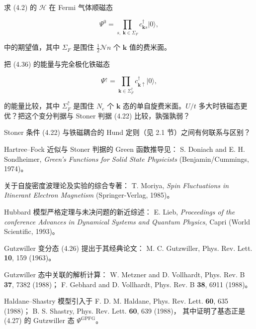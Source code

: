 \begin{exercises}

\item 求 (4.2) 的 $\mathcal{H}$ 在 Fermi 气体顺磁态

\begin{equation*}
\Psi^ {0} = \prod_ {s,\; \mathbf {k} \in \Sigma_ {F}} c _ {\mathbf {k} s} ^ {\dagger} | 0 \rangle ,
\tag{4.36}
\end{equation*}

中的期望值，其中 $\Sigma_{F}$ 是围住 $\frac{1}{2}\mathcal{N}n$ 个 $\mathbf{k}$ 值的费米面。

\item 把 (4.36) 的能量与完全极化铁磁态

\begin{equation*}
\Psi^ {\uparrow} = \prod_ {\mathbf {k} \in \Sigma_ {F} ^ {\uparrow}} c _ {\mathbf {k} \uparrow} ^ {\dagger} | 0 \rangle ,
\tag{4.37}
\end{equation*}

的能量比较，其中 $\Sigma_F^\uparrow$ 是围住 $N_e$ 个 $\mathbf{k}$ 态的单自旋费米面。$U/t$ 多大时铁磁态更优？把这个变分判据与 Stoner 判据 (4.22) 比较，孰强孰弱？

\item Stoner 条件 (4.22) 与铁磁耦合的 Hund 定则（见 2.1 节）之间有何联系与区别？

\end{exercises}

\begin{chapbib}
\item Hartree--Fock 近似与 Stoner 判据的 Green 函数推导见：
  S. Doniach and E. H. Sondheimer, \textit{Green's Functions for Solid State Physicists} (Benjamin/Cummings, 1974)。
\item 关于自旋密度波理论及实验的综合专著：
  T. Moriya, \textit{Spin Fluctuations in Itinerant Electron Magnetism} (Springer-Verlag, 1985)。
\item Hubbard 模型严格定理与未决问题的新近综述：
  E. Lieb, \textit{Proceedings of the conference Advances in Dynamical Systems and Quantum Physics}, Capri (World Scientific, 1993)。
\item Gutzwiller 变分态 (4.26) 提出于其经典论文：
  M. C. Gutzwiller, Phys. Rev. Lett. \textbf{10}, 159 (1963)。
\item Gutzwiller 态中关联的解析计算：
  W. Metzner and D. Vollhardt, Phys. Rev. B \textbf{37}, 7382 (1988)；
  F. Gebhard and D. Vollhardt, Phys. Rev. B \textbf{38}, 6911 (1988)。
\item Haldane--Shastry 模型引入于
  F. D. M. Haldane, Phys. Rev. Lett. \textbf{60}, 635 (1988)；
  B. S. Shastry, Phys. Rev. Lett. \textbf{60}, 639 (1988)，
  其中证明了基态正是 (4.27) 的 Gutzwiller 态 $\Psi^{\mathrm{GPFG}}$。
\end{chapbib}
